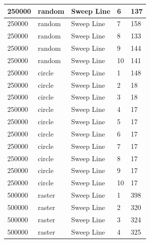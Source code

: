 \documentclass[12pt]{article}
\begin{document}
\begin{longtable}{|l|l|l|l|l|}
250000       & random            & Sweep Line & 6          & 137                           \\ \hline
250000       & random            & Sweep Line & 7          & 158                           \\ \hline
250000       & random            & Sweep Line & 8          & 133                           \\ \hline
250000       & random            & Sweep Line & 9          & 144                           \\ \hline
250000       & random            & Sweep Line & 10         & 141                           \\ \hline
250000       & circle            & Sweep Line & 1          & 148                           \\ \hline
250000       & circle            & Sweep Line & 2          & 18                            \\ \hline
250000       & circle            & Sweep Line & 3          & 18                            \\ \hline
250000       & circle            & Sweep Line & 4          & 17                            \\ \hline
250000       & circle            & Sweep Line & 5          & 17                            \\ \hline
250000       & circle            & Sweep Line & 6          & 17                            \\ \hline
250000       & circle            & Sweep Line & 7          & 17                            \\ \hline
250000       & circle            & Sweep Line & 8          & 17                            \\ \hline
250000       & circle            & Sweep Line & 9          & 17                            \\ \hline
250000       & circle            & Sweep Line & 10         & 17                            \\ \hline
500000       & raster            & Sweep Line & 1          & 398                           \\ \hline
500000       & raster            & Sweep Line & 2          & 320                           \\ \hline
500000       & raster            & Sweep Line & 3          & 324                           \\ \hline
500000       & raster            & Sweep Line & 4          & 325                           \\ \hline

\end{longtable}
\end{document}
